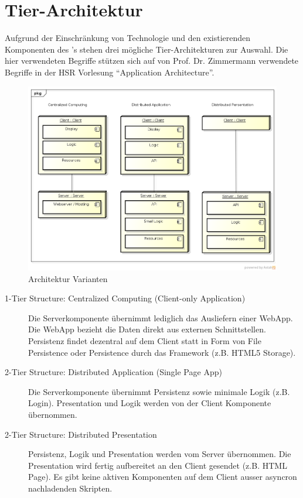 	
	\section{Tier-Architektur}
		Aufgrund der Einschränkung von Technologie und den existierenden Komponenten des \cdar's stehen drei mögliche Tier-Architekturen zur Auswahl.
		Die hier verwendeten Begriffe stützen sich auf von Prof. Dr. Zimmermann verwendete Begriffe in der HSR Vorlesung "`Application Architecture"'\cite{prof._dr._zimmerman_layers_2014}.		
		
		\begin{figure}[H]
			\includegraphics[width=\textwidth]{architecture/media/img/tierArchitecture.png}
			\centering
			\caption{Architektur Varianten}
			\label{fig:tierArchitecture}
		\end{figure}
		\begin{description}
			\item[1-Tier Structure: Centralized Computing (Client-only Application)]
				Die Serverkomponente übernimmt lediglich das Ausliefern einer WebApp. 
				Die WebApp bezieht die Daten direkt aus externen Schnittstellen. 
				Persistenz findet dezentral auf dem Client statt in Form von File Persistence oder 
				Persistence durch das Framework (z.B. HTML5 Storage).
				
			\item[2-Tier Structure: Distributed Application (Single Page App)]
				Die Serverkomponente übernimmt Persistenz sowie minimale Logik (z.B. Login).
				Presentation und Logik werden von der Client Komponente übernommen.
				
			\item[2-Tier Structure: Distributed Presentation]
				Persistenz, Logik und Presentation werden vom Server übernommen.
				Die Presentation wird fertig aufbereitet an den Client gesendet (z.B. HTML Page).
				Es gibt keine aktiven Komponenten auf dem Client ausser asyncron nachladenden Skripten.
				
		\end{description}
	
